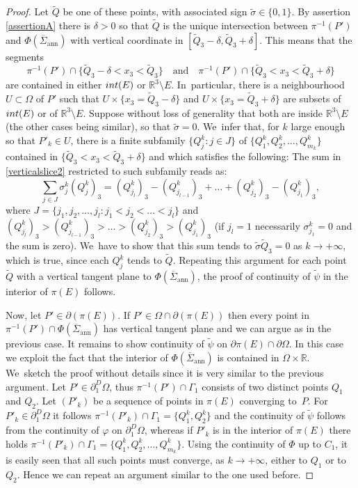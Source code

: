 \documentclass[11pt]{article}
\numberwithin{equation}{section}
\newcommand{\R}{\mathbb{R}}
\let\Om\Omega
\newcommand{\immclosedann}{\Phi({\overline\Sigma}_\mathrm{ann})}
\newcommand{\pointinOm}{P'}
\theoremstyle{definition}
\begin{document}
\begin{proof}
Let $\widetilde Q$
be one of these points, with associated sign $\widetilde\sigma \in \{0,1\}$.
By assertion \ref{assertionA} there is $\delta>0$
so that $\widetilde Q$ is the unique intersection between $\pi^{-1}(\pointinOm)$ and
$\immclosedann$ with vertical coordinate in $[\widetilde Q_3-\delta,\widetilde Q_3+\delta]$.
This means that the segments
\[
\pi^{-1}(\pointinOm)\cap\{\widetilde Q_3-\delta<x_3<\widetilde Q_3\}\quad\text{and}\quad \pi^{-1}(\pointinOm)\cap\{\widetilde Q_3<x_3<\widetilde Q_3+\delta\}
\]
are contained in either $\textup{int}(E)$ or
$\R^3\setminus E$. In~particular,
there is a neighbourhood $U\subset\Omega$ of $\pointinOm$ such that $U\times \{x_3=\widetilde Q_3-\delta\}$ and $U\times \{x_3=\widetilde Q_3+\delta\}$ are
subsets of $\textup{int}(E)$ or of $\R^3\setminus E$. Suppose
without loss of generality that both are inside $\R^3\setminus E$ (the other cases being
similar),
so that $\widetilde \sigma=0$. We~infer that, for $k$ large enough so that $\pointinOm_k\in U$,
there is a finite subfamily $\{Q^k_j:j\in J\}$ of $\{Q^k_1,Q^k_2,\dots,Q^k_{m_k}\}$ contained in $\{ \widetilde Q_3<x_3<\widetilde Q_3+\delta\}$ and which satisfies the following: The sum in \eqref{verticalslice2} restricted to such subfamily reads as:
\[
 \sum_{j\in J}\sigma^k_j (Q^k_j)_3=(Q^k_{j_l})_3-(Q^k_{j_{l-1}})_3+\dots+(Q^k_{j_2})_3-(Q^k_{j_1})_3,
\]
where
$J=\{j_1,j_2,\dots,j_l : j_1<j_2<\dots<j_l\}$ and $(Q^k_{j_l})_3>(Q^k_{j_{l-1}})_3>\dots>(Q^k_{j_2})_3>(Q^k_{j_1})_3$ (if $j_l=1$ necessarily $\sigma_{j_1}^k=0$ and the sum is zero). We~have to show that this sum tends to $\widetilde\sigma \widetilde Q_3=0$ as $k\to
+\infty$, which is true, since each $Q^k_j$ tends to $\widetilde Q$.
Repeating this argument for each point $\widetilde Q$
with a vertical tangent plane to $\immclosedann$,
the proof of continuity of $\widetilde\psi$ in the interior of $\pi(E)$ follows.

Now, let
$\pointinOm\in\partial(\pi(E))$. If $\pointinOm\in \Om
\cap \partial(\pi(E))$
then every point in $\pi^{-1}(\pointinOm)\cap \immclosedann$ has vertical tangent plane
and we can argue as in the previous case.
It remains to show continuity of $\widetilde \psi$
on $\partial\pi(E)\cap \partial\Omega$. In this case we
exploit the fact that the interior of
$\immclosedann$ is contained in $\Om\times \R$. We~sketch the proof without details since it is very similar to the previous argument. Let
$\pointinOm\in \partial_1^D\Om$,
thus $\pi^{-1}(\pointinOm)\cap\Gamma_1$ consists of two distinct points
$Q_1$ and $Q_2$. Let $(\pointinOm_k)$
be a sequence of points in ${\pi(E)}$
converging to~$P$.
For $\pointinOm_k \in \partial^D_1\Om$ it follows $\pi^{-1}(\pointinOm_k)
\cap\Gamma_1=\{Q^k_1,Q^k_2\}$ and the continuity of $\widetilde\psi$
follows from the continuity of $\varphi$ on $\partial^D_1\Om$,
whereas if $\pointinOm_k$
is in the interior of $\pi(E)$ there holds $\pi^{-1}(\pointinOm_k)
\cap\Gamma_1=\{Q^k_1,Q^k_2,\dots, Q^k_{m_k}\}$.
Using the continuity of $\Phi$ up to $C_1$, it is easily seen that all such points must converge,
as $k\to +\infty$, either to $Q_1$ or to $Q_2$.
Hence we can repeat an argument similar to the one used before.
\end{proof}
\end{document}
